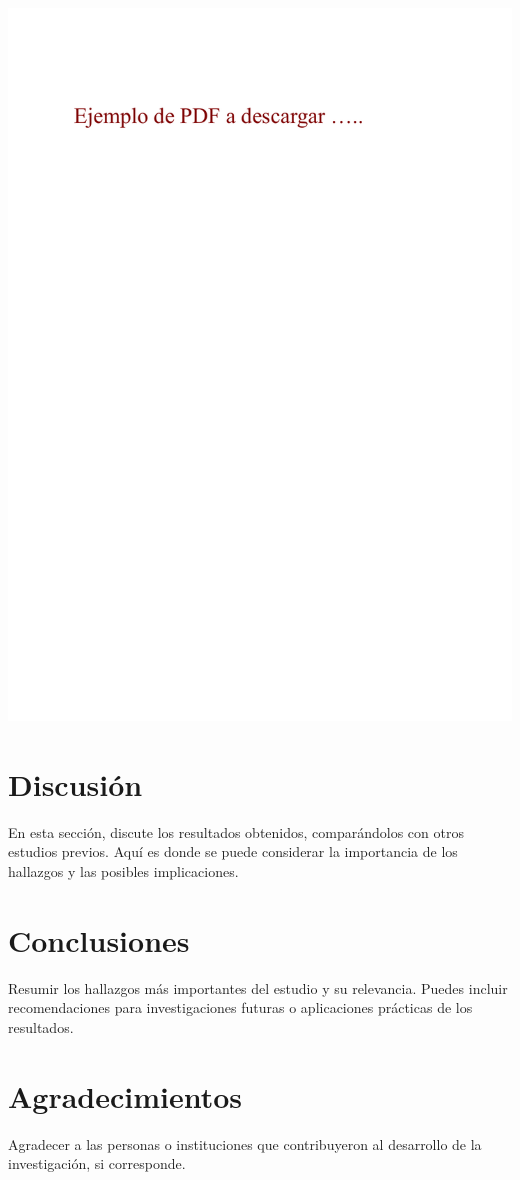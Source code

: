 \documentclass[twocolumn]{article}
\begin{document}
\includegraphics[scale=0.4]{Ejemplo.pdf}
\section{Discusión}  
En esta sección, discute los resultados obtenidos, comparándolos con otros estudios previos. Aquí es donde se puede considerar la importancia de los hallazgos y las posibles implicaciones.  

\section{Conclusiones}  
Resumir los hallazgos más importantes del estudio y su relevancia. Puedes incluir recomendaciones para investigaciones futuras o aplicaciones prácticas de los resultados.  

\section*{Agradecimientos}  
Agradecer a las personas o instituciones que contribuyeron al desarrollo de la investigación, si corresponde.  
  
 
%  
\end{document}
